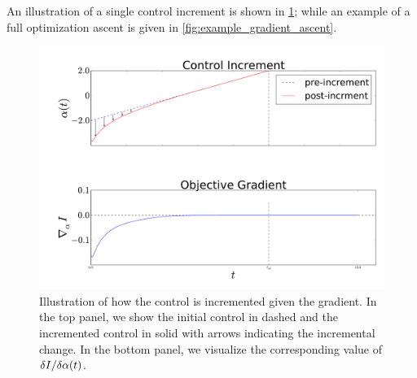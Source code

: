 \documentclass{article}
\begin{document}
An illustration of a single control increment is shown in
\cref{fig:example_control_increment}; while an example of a full optimization ascent is given in \cref{fig:example_gradient_ascent}.

\begin{figure}[htp] 
\begin{center}
  \includegraphics[width=\textwidth]{Figs/FP_Adjoint/control_increment_example.pdf}
  \caption[Single control Increment Illustration]{Illustration of how the
  control is incremented given the gradient. In the top panel, we show the
  initial control in dashed and the incremented control in solid with arrows
  indicating the incremental change. In the bottom panel, we visualize the
  corresponding value of $\delta I/ \delta {\alpha} (t)$. }
  \label{fig:example_control_increment}    
\end{center}
\end{figure}   
           
\end{document}
